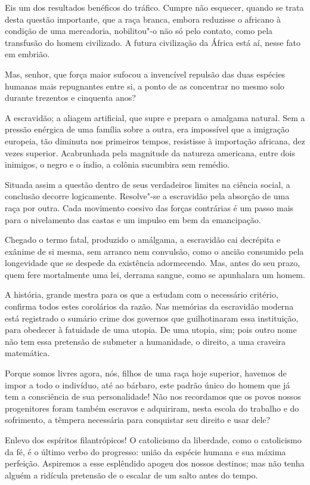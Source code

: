 Eis um dos resultados benéficos do tráfico. Cumpre não esquecer, quando
se trata desta questão importante, que a raça branca, embora reduzisse
o africano à condição de uma mercadoria, nobilitou"-o não só pelo
contato, como pela transfusão do homem civilizado. A futura civilização
da África está aí, nesse fato em embrião.

Mas, senhor, que força maior sufocou a invencível repulsão das duas
espécies humanas mais repugnantes entre si, a ponto de as concentrar no
mesmo solo durante trezentos e cinquenta anos? 

A escravidão; a aliagem artificial, que supre e prepara o amalgama
natural. Sem a pressão enérgica de uma família sobre a outra, era
impossível que a imigração europeia, tão diminuta nos primeiros tempos,
resistisse à importação africana, dez vezes superior. Acabrunhada pela
magnitude da natureza americana, entre dois inimigos, o negro e o
índio, a colônia sucumbira sem remédio.

Situada assim a questão dentro de seus verdadeiros limites na ciência
social, a conclusão decorre logicamente. Resolve"-se a escravidão pela
absorção de uma raça por outra. Cada movimento coesivo das forças
contrárias é um passo mais para o nivelamento das castas e um impulso
em bem da emancipação.

Chegado o termo fatal, produzido o amálgama, a escravidão cai decrépita
e exânime de si mesma, sem arranco nem convulsão, como o ancião
consumido pela longevidade que se despede da existência adormecendo.
Mas, antes do seu prazo, quem fere mortalmente uma lei, derrama sangue,
como se apunhalara um homem.

A história, grande mestra para os que a estudam com o necessário
critério, confirma todos estes corolários da razão. Nas memórias da
escravidão moderna está registrado o sumário crime dos governos que
guilhotinaram essa instituição, para obedecer à fatuidade de uma
utopia. De uma utopia, sim; pois outro nome não tem essa pretensão de
submeter a humanidade, o direito, a uma craveira matemática.

Porque somos livres agora, nós, filhos de uma raça hoje superior,
havemos de impor a todo o indivíduo, até ao bárbaro, este padrão único
do homem que já tem a consciência de sua personalidade! Não nos
recordamos que os povos nossos progenitores foram também escravos e
adquiriram, nesta escola do trabalho e do sofrimento, a têmpera
necessária para conquistar seu direito e usar dele?  

Enlevo dos espíritos filantrópicos! O catolicismo da liberdade, como o
catolicismo da fé, é o último verbo do progresso: união da espécie
humana e sua máxima perfeição. Aspiremos a esse esplêndido apogeu dos
nossos destinos; mas não tenha alguém a ridícula pretensão de o escalar
de um salto antes do tempo. 

